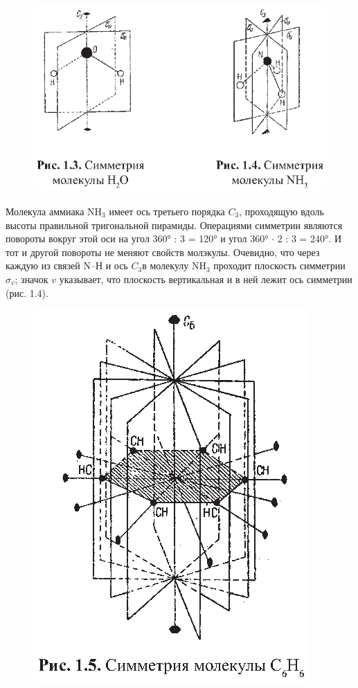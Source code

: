 \begin{figure}[tbp]
\centerline{\hbox{\includegraphics[scale=1]{Ris/ris_eps/ris1_03.eps}}}

\end{figure}
Молекула аммиака NH$_3$ имеет ось третьего порядка $C_3$, проходящую вдоль 
высоты правильной тригональной пирамиды. Операциями симметрии являются повороты 
вокруг этой оси на угол 360° : 3 = 120° и угол 360° $\cdot$ 2 : 3 = 240°. И тот 
и другой повороты не меняют свойств молэкулы. Очевидно, что через каждую из связей 
N--Н и ось $C_3$в молекулу NH$_3$ проходит плоскость симметрии $\sigma_v$; 
значок $v$ указывает, что плоскость вертикальная и в ней лежит ось симметрии (рис. 1.4).

\begin{figure}[tbp]
\centerline{\hbox{\includegraphics[scale=1]{Ris/ris_eps/ris1_05.eps}}}

\end{figure}

